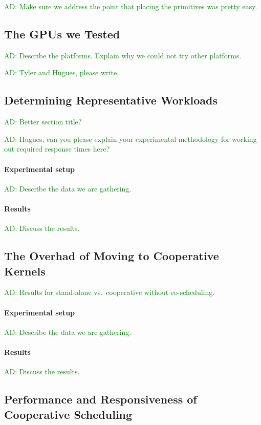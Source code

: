 \documentclass[numbers,nocopyrightspace,10pt]{sigplanconf}
\newcommand{\ADComment}[1]{\textcolor{green}{AD: #1}}
\begin{document}
\ADComment{Make sure we address the point that placing the primitives was pretty easy.}

\subsection{The GPUs we Tested}

\ADComment{Describe the platforms.  Explain why we could not try other
  platforms.}

\ADComment{Tyler and Hugues, please write.}

\subsection{Determining Representative Workloads}

\ADComment{Better section title?}

\ADComment{Hugues, can you please explain your experimental
  methodology for working out required response times here?}

\paragraph{Experimental setup}  \ADComment{Describe the data we are gathering.}

\paragraph{Results}  \ADComment{Discuss the results.}

\subsection{The Overhad of Moving to Cooperative Kernels}

\ADComment{Results for stand-alone vs.\ cooperative without co-scheduling.}

\paragraph{Experimental setup}  \ADComment{Describe the data we are gathering.}

\paragraph{Results}  \ADComment{Discuss the results.}

\subsection{Performance and Responsiveness of Cooperative Scheduling}
\end{document}
